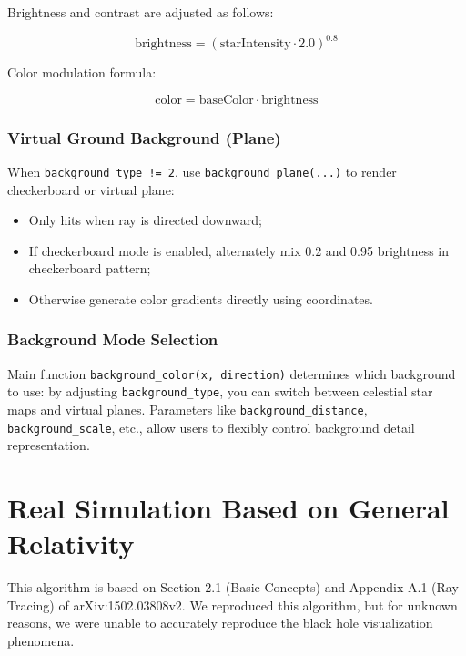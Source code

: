 \documentclass[11pt,a4paper]{article}
\begin{document}
Brightness and contrast are adjusted as follows:

\begin{equation}
\text{brightness} = (\text{starIntensity} \cdot 2.0)^{0.8}
\end{equation}

Color modulation formula:

\begin{equation}
\text{color} = \text{baseColor} \cdot \text{brightness}
\end{equation}

\subsubsection{Virtual Ground Background (Plane)}

When \texttt{background\_type != 2}, use \texttt{background\_plane(...)} to render checkerboard or virtual plane:

\begin{itemize}
    \item Only hits when ray is directed downward;
    \item If checkerboard mode is enabled, alternately mix 0.2 and 0.95 brightness in checkerboard pattern;
    \item Otherwise generate color gradients directly using coordinates.
\end{itemize}

\subsubsection{Background Mode Selection}

Main function \texttt{background\_color(x, direction)} determines which background to use: by adjusting \texttt{background\_type}, you can switch between celestial star maps and virtual planes. Parameters like \texttt{background\_distance}, \texttt{background\_scale}, etc., allow users to flexibly control background detail representation.

\section{Real Simulation Based on General Relativity}

This algorithm is based on Section 2.1 (Basic Concepts) and Appendix A.1 (Ray Tracing) of arXiv:1502.03808v2. We reproduced this algorithm, but for unknown reasons, we were unable to accurately reproduce the black hole visualization phenomena.
\end{document}
